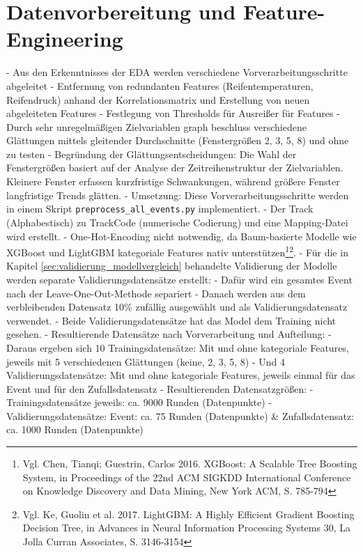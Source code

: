 \section{Datenvorbereitung und Feature-Engineering}

- Aus den Erkenntnisses der EDA werden verschiedene Vorverarbeitungsschritte abgeleitet
- Entfernung von redundanten Features (Reifentemperaturen, Reifendruck) anhand der Korrelationsmatrix und Erstellung von neuen abgeleiteten Features
- Festlegung von Thresholds für Ausreißer für Features
- Durch sehr unregelmäßigen Zielvariablen graph beschluss verschiedene Glättungen mittels gleitender Durchschnitte (Fenstergrößen 2, 3, 5, 8) und ohne zu testen
- Begründung der Glättungsentscheidungen: Die Wahl der Fenstergrößen basiert auf der Analyse der Zeitreihenstruktur der Zielvariablen. Kleinere Fenster erfassen kurzfristige Schwankungen, während größere Fenster langfristige Trends glätten.
- Umsetzung: Diese Vorverarbeitungsschritte werden in einem Skript \texttt{preprocess\_all\_events.py} implementiert.
- Der Track (Alphabestisch) zu TrackCode (numerische Codierung) und eine Mapping-Datei wird erstellt.
- One-Hot-Encoding nicht notwendig, da Baum-basierte Modelle wie XGBoost und LightGBM kategoriale Features nativ unterstützen\footnote{Vgl. Chen, Tianqi; Guestrin, Carlos 2016. XGBoost: A Scalable Tree Boosting System, in Proceedings of the 22nd ACM SIGKDD International Conference on Knowledge Discovery and Data Mining, New York ACM, S. 785-794}\footnote{Vgl. Ke, Guolin et al. 2017. LightGBM: A Highly Efficient Gradient Boosting Decision Tree, in Advances in Neural Information Processing Systems 30, La Jolla Curran Associates, S. 3146-3154}.
- Für die in Kapitel \ref{sec:validierung_modellvergleich} behandelte Validierung der Modelle werden separate Validierungsdatensätze erstellt:
- Dafür wird ein gesamtes Event nach der Leave-One-Out-Methode separiert
- Danach werden aus dem verbleibenden Datensatz 10\% zufällig ausgewählt und als Validierungsdatensatz verwendet.
- Beide Validierungsdatensätze hat das Model dem Training nicht gesehen.
- Resultierende Datensätze nach Vorverarbeitung und Aufteilung: 
- Daraus ergeben sich 10 Trainingsdatensätze: Mit und ohne kategoriale Features, jeweils mit 5 verschiedenen Glättungen (keine, 2, 3, 5, 8)
- Und 4 Validierungsdatensätze: Mit und ohne kategoriale Features, jeweils einmal für das Event und für den Zufallsdatensatz
- Resultierenden Datensatzgrößen:
- Trainingsdatensätze jeweils: ca. 9000 Runden (Datenpunkte)
- Validierungsdatensätze: Event: ca. 75 Runden (Datenpunkte) \& Zufallsdatensatz: ca. 1000 Runden (Datenpunkte)

